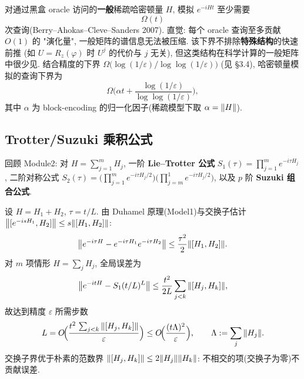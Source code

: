 \documentclass[utf8]{article} %
\numberwithin{equation}{section}   %
\newtheorem{Thm}{\hskip 2em {\color{blue} 定理}}[subsection]
\newtheorem{Note}{\hskip 2em {\color{red} 注}}[subsection]
\begin{document}
\begin{Note}
    对通过黑盒 oracle 访问的\textbf{一般}稀疏哈密顿量 $H$,
    模拟 $e^{-iHt}$ 至少需要
    \begin{equation}
        \Omega(t)
    \end{equation}
    次查询(Berry--Ahokas--Cleve--Sanders 2007). 直觉: 每个 oracle 查询至多贡献 $O(1)$ 的
    "演化量", 一般矩阵的谱信息无法被压缩. 该下界不排除\textbf{特殊结构}的快速前推
    (如 $U = R_z(\varphi)$ 时 $U^j$ 的代价与 $j$ 无关), 但这类结构在科学计算的一般矩阵中很少见.
    结合精度的下界 $\Omega\big(\log(1/\varepsilon)/\log\log(1/\varepsilon)\big)$
    (见 §3.4), 哈密顿量模拟的查询下界为
    \begin{equation}
        \Omega\!\Big(\alpha t + \frac{\log(1/\varepsilon)}{\log\log(1/\varepsilon)}\Big),
    \end{equation}
    其中 $\alpha$ 为 block-encoding 的归一化因子(稀疏模型下取 $\alpha = \norm{H}$).
\end{Note}

\subsection{Trotter/Suzuki 乘积公式}

回顾 Module2: 对 $H = \sum_{j=1}^m H_j$, 一阶 \textbf{Lie--Trotter 公式}
$S_1(\tau) = \prod_{j=1}^m e^{-i\tau H_j}$, 二阶对称公式
$S_2(\tau) = \Big(\prod_{j=1}^m e^{-i\tau H_j/2}\Big)\Big(\prod_{j=m}^1 e^{-i\tau H_j/2}\Big)$,
以及 $p$ 阶 \textbf{Suzuki 组合公式}.

\begin{Thm}
    设 $H = H_1 + H_2$, $\tau = t/L$. 由 Duhamel 原理(Model1)与交换子估计
    $\norm{[e^{-isH_1}, H_2]} \le s\norm{[H_1,H_2]}$:
    \begin{equation}
        \norm{e^{-i\tau H} - e^{-i\tau H_1}e^{-i\tau H_2}}
        \le \frac{\tau^2}{2}\norm{[H_1,H_2]}.
    \end{equation}
    对 $m$ 项情形 $H = \sum_j H_j$, 全局误差为
    \begin{equation}
        \norm{e^{-itH} - S_1(t/L)^L} \le \frac{t^2}{2L}\sum_{j<k}\norm{[H_j, H_k]},
    \end{equation}
    故达到精度 $\varepsilon$ 所需步数
    \begin{equation}
        L = O\!\Big(\frac{t^2\,\sum_{j<k}\norm{[H_j,H_k]}}{\varepsilon}\Big)
        \le O\!\Big(\frac{(t\Lambda)^2}{\varepsilon}\Big),
        \qquad \Lambda := \sum_j \norm{H_j}.
    \end{equation}
    交换子界优于朴素的范数界 $\norm{[H_j,H_k]} \le 2\norm{H_j}\norm{H_k}$:
    不相交的项(交换子为零)不贡献误差.
\end{Thm}
\end{document}
